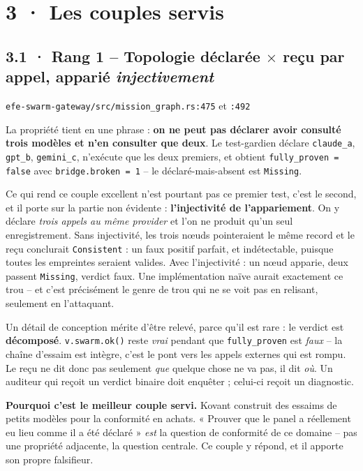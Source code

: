 \documentclass[10pt]{article}
\newcommand{\sz}[1]{{\small\color{grey}\textsf{#1}}}
\newcommand{\code}[1]{\texttt{\small #1}}
\newcommand{\x}{$\times$}
\begin{document}
\section{3 · Les couples servis}

\subsection{3.1 · Rang 1 -- Topologie déclarée \x{} reçu par appel, apparié \emph{injectivement}}

\sz{\code{efe-swarm-gateway/src/mission\_graph.rs:475} et \code{:492}}

La propriété tient en une phrase : \textbf{on ne peut pas déclarer avoir consulté trois modèles et
n'en consulter que deux}. Le test-gardien déclare \code{claude\_a}, \code{gpt\_b}, \code{gemini\_c},
n'exécute que les deux premiers, et obtient \code{fully\_proven = false} avec \code{bridge.broken = 1}
-- le déclaré-mais-absent est \code{Missing}.

Ce qui rend ce couple excellent n'est pourtant pas ce premier test, c'est le second, et il porte sur
la partie non évidente : \textbf{l'injectivité de l'appariement}. On y déclare \emph{trois appels au
même provider} et l'on ne produit qu'un seul enregistrement. Sans injectivité, les trois n\oe uds
pointeraient le même record et le reçu conclurait \code{Consistent} : un faux positif parfait, et
indétectable, puisque toutes les empreintes seraient valides. Avec l'injectivité : un n\oe ud apparie,
deux passent \code{Missing}, verdict faux. Une implémentation naïve aurait exactement ce trou -- et
c'est précisément le genre de trou qui ne se voit pas en relisant, seulement en l'attaquant.

Un détail de conception mérite d'être relevé, parce qu'il est rare : le verdict est \textbf{décomposé}.
\code{v.swarm.ok()} reste \emph{vrai} pendant que \code{fully\_proven} est \emph{faux} -- la chaîne
d'essaim est intègre, c'est le pont vers les appels externes qui est rompu. Le reçu ne dit donc pas
seulement \emph{que} quelque chose ne va pas, il dit \emph{où}. Un auditeur qui reçoit un verdict
binaire doit enquêter ; celui-ci reçoit un diagnostic.

\begin{acquis}
\textbf{Pourquoi c'est le meilleur couple servi.} Kovant construit des essaims de petits modèles pour
la conformité en achats. « Prouver que le panel a réellement eu lieu comme il a été déclaré » \emph{est}
la question de conformité de ce domaine -- pas une propriété adjacente, la question centrale. Ce couple
y répond, et il apporte son propre falsifieur.
\end{acquis}
\end{document}
